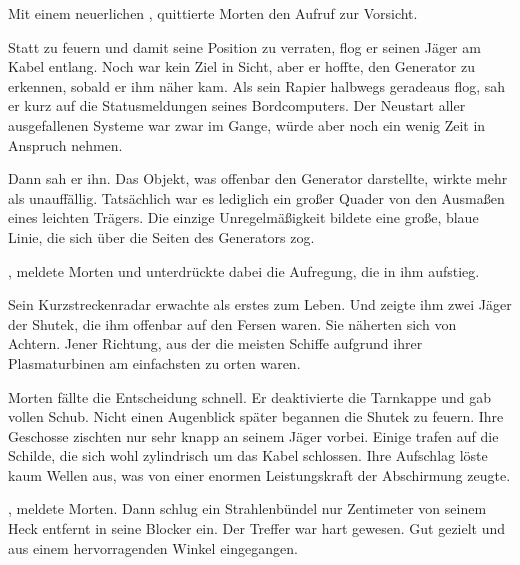 \par

Mit einem neuerlichen , quittierte Morten den Aufruf zur Vorsicht.

\par

Statt zu feuern und damit seine Position zu verraten, flog er seinen Jäger am Kabel entlang. Noch war kein Ziel in Sicht, aber er hoffte, den Generator zu erkennen, sobald er ihm näher kam. Als sein Rapier halbwegs geradeaus flog, sah er kurz auf die Statusmeldungen seines Bordcomputers. Der Neustart aller ausgefallenen Systeme war zwar im Gange, würde aber noch ein wenig Zeit in Anspruch nehmen.

\par

Dann sah er ihn. Das Objekt, was offenbar den Generator darstellte, wirkte mehr als unauffällig. Tatsächlich war es lediglich ein großer Quader von den Ausmaßen eines leichten Trägers. Die einzige Unregelmäßigkeit bildete eine große, blaue Linie, die sich über die Seiten des Generators zog.

\par

, meldete Morten und unterdrückte dabei die Aufregung, die in ihm aufstieg.

\par

Sein Kurzstreckenradar erwachte als erstes zum Leben. Und zeigte ihm zwei Jäger der Shutek, die ihm offenbar auf den Fersen waren. Sie näherten sich von Achtern. Jener Richtung, aus der die meisten Schiffe aufgrund ihrer Plasmaturbinen am einfachsten zu orten waren.

\par

Morten fällte die Entscheidung schnell. Er deaktivierte die Tarnkappe und gab vollen Schub. Nicht einen Augenblick später begannen die Shutek zu feuern. Ihre Geschosse zischten nur sehr knapp an seinem Jäger vorbei. Einige trafen auf die Schilde, die sich wohl zylindrisch um das Kabel schlossen. Ihre Aufschlag löste kaum Wellen aus, was von einer enormen Leistungskraft der Abschirmung zeugte.

\par

, meldete Morten. Dann schlug ein Strahlenbündel nur Zentimeter von seinem Heck entfernt in seine Blocker ein. Der Treffer war hart gewesen. Gut gezielt und aus einem hervorragenden Winkel eingegangen.

